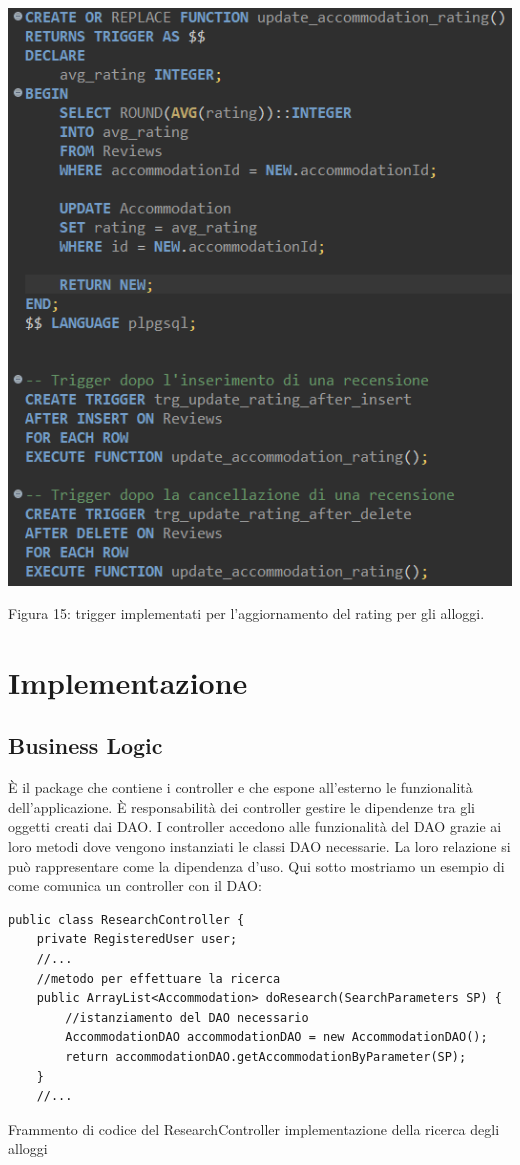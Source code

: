 \documentclass[10pt]{article}
\begin{document}
\begin{center}
\par\medskip
\includegraphics[scale=0.65]{trigger/trigger}
\par\medskip
Figura 15: trigger implementati per l'aggiornamento del rating per gli alloggi.
\par\medskip
\end{center}

\section{Implementazione}
\subsection{Business Logic}

\`E il package che contiene i controller e che espone all'esterno le funzionalità dell'applicazione. \`E responsabilità dei controller gestire le dipendenze tra gli oggetti creati dai DAO. I controller accedono alle funzionalità del DAO grazie ai loro metodi dove vengono instanziati le classi DAO necessarie. La loro relazione si può rappresentare come la dipendenza d'uso.
Qui sotto mostriamo un esempio di come comunica un controller con il DAO:
\clearpage
\begin{lstlisting}
public class ResearchController {
    private RegisteredUser user;
    //...
    //metodo per effettuare la ricerca
    public ArrayList<Accommodation> doResearch(SearchParameters SP) {
        //istanziamento del DAO necessario
        AccommodationDAO accommodationDAO = new AccommodationDAO();  
        return accommodationDAO.getAccommodationByParameter(SP);
    }
    //...
\end{lstlisting}
\par\medskip
Frammento di codice del ResearchController implementazione della ricerca degli alloggi
\par\medskip
\end{document}
